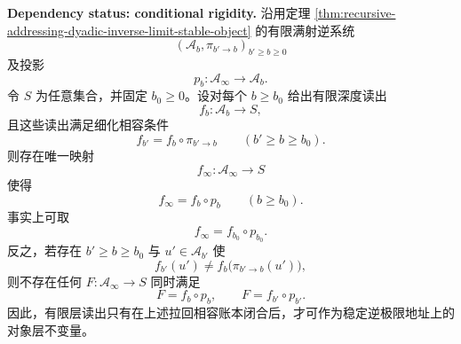 \begin{proposition}[有限深度读出的细化稳定判据]\label{prop:distill-cech-cohomology-dyadic-refinement-stable-readout}
\textbf{Dependency status: conditional rigidity.}
沿用定理 \ref{thm:recursive-addressing-dyadic-inverse-limit-stable-object} 的有限满射逆系统
\[
(\mathcal A_b,\pi_{b'\to b})_{b'\ge b\ge0}
\]
及投影
\[
p_b:\mathcal A_\infty\to\mathcal A_b.
\]
令 \(S\) 为任意集合，并固定 \(b_0\ge0\)。设对每个 \(b\ge b_0\) 给出有限深度读出
\[
f_b:\mathcal A_b\longrightarrow S,
\]
且这些读出满足细化相容条件
\[
f_{b'}=f_b\circ \pi_{b'\to b}
\qquad(b'\ge b\ge b_0).
\]
则存在唯一映射
\[
f_\infty:\mathcal A_\infty\longrightarrow S
\]
使得
\[
f_\infty=f_b\circ p_b
\qquad(b\ge b_0).
\]
事实上可取
\[
f_\infty=f_{b_0}\circ p_{b_0}.
\]
反之，若存在 \(b'\ge b\ge b_0\) 与 \(u'\in\mathcal A_{b'}\) 使
\[
f_{b'}(u')\ne f_b\bigl(\pi_{b'\to b}(u')\bigr),
\]
则不存在任何 \(F:\mathcal A_\infty\to S\) 同时满足
\[
F=f_b\circ p_b,\qquad F=f_{b'}\circ p_{b'}.
\]
因此，有限层读出只有在上述拉回相容账本闭合后，才可作为稳定逆极限地址上的对象层不变量。
\end{proposition}

